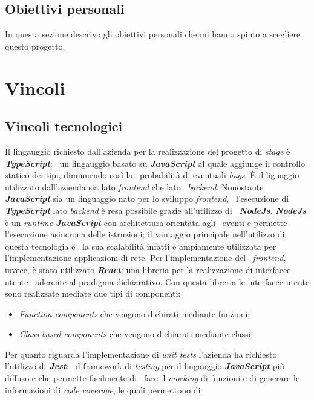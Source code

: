 \subsection{Obiettivi personali}
In questa sezione descrivo gli obiettivi personali che mi hanno spinto a scegliere questo progetto.

\section{Vincoli}

\subsection{Vincoli tecnologici}
Il lingauggio richiesto dall'azienda per la realizzazione del progetto di \emph{stage} è \emph{\textbf{TypeScript}}: \
un lingauggio basato su \emph{\textbf{JavaScript}} al quale aggiunge il controllo statico dei tipi, diminuendo così la \
probabilità di eventuali \emph{bugs}. È il liguaggio utilizzato dall'azienda sia lato \emph{\gls{frontend}} che lato \
\emph{\gls{backend}}. Nonostante \emph{\textbf{JavaScript}} sia un linguaggio nato per lo sviluppo \emph{frontend}, \
l'esecuzione di \emph{\textbf{TypeScript}} lato \emph{backend} è resa possibile grazie all'utilizzo di \
\emph{\textbf{NodeJs}}. \emph{\textbf{NodeJs}} è un \emph{runtime \textbf{JavaScript}} con architettura orientata agli \
eventi e permette l'esecuzione asincrona delle istruzioni; il vantaggio principale nell'utilizzo di questa tecnologia è \
la sua scalabilità infatti è ampiamente utilizzata per l'implementazione applicazioni di rete. Per l'implementazione del \
\emph{frontend}, invece, è stato utilizzato \emph{\textbf{React}}: una libreria per la realizzazione di interfacce utente \
aderente al pradigma dichiarativo. Con questa libreria le interfacce utente sono realizzate mediate due tipi di componenti: \
\begin{itemize}
  \item \emph{Function components} che vengono dichirati mediante funzioni;
  \item \emph{Class-based components} che vengono dichiarati mediante classi.
\end{itemize}
Per quanto riguarda l'implementazione di \emph{unit tests} l'azienda ha richiesto l'utilizzo di \emph{\textbf{Jest}}: \
il framework di \emph{testing} per il lingauggio \emph{\textbf{JavaScript}} più diffuso e che permette facilmente di \
fare il \emph{mocking} di funzioni e di generare le informazioni di \emph{code coverage}, le quali permettono di \
